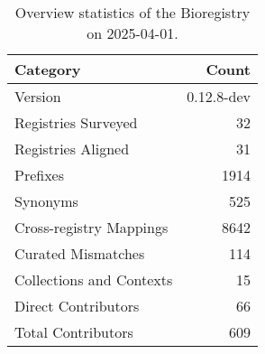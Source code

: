 \begin{table}
\caption{Overview statistics of the Bioregistry on 2025-04-01.}
\label{tab:bioregistry-summary}
\begin{tabular}{lr}
\toprule
Category & Count \\
\midrule
Version & 0.12.8-dev \\
Registries Surveyed & 32 \\
Registries Aligned & 31 \\
Prefixes & 1914 \\
Synonyms & 525 \\
Cross-registry Mappings & 8642 \\
Curated Mismatches & 114 \\
Collections and Contexts & 15 \\
Direct Contributors & 66 \\
Total Contributors & 609 \\
\bottomrule
\end{tabular}
\end{table}
